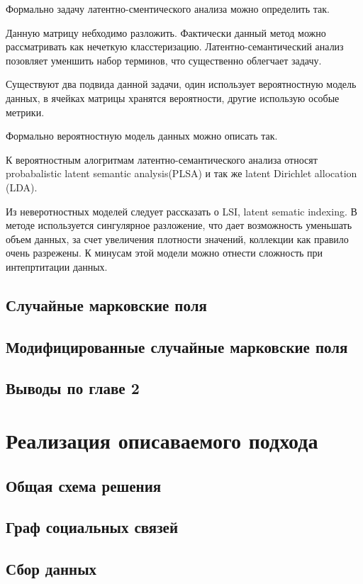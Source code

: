 \documentclass[annotation,times,page4]{itmo-student-thesis}
\begin{document}
Формально задачу латентно-сментического анализа можно определить так.

Данную матрицу небходимо разложить. Фактически данный метод можно рассматривать как нечеткую класстеризацию. Латентно-семантический анализ позовляет уменшить набор терминов, что существенно облегчает задачу.

Существуют два подвида данной задачи, один использует вероятностную модель данных, в ячейках матрицы хранятся вероятности, другие использую особые метрики.

Формально вероятностную модель данных можно описать так.

К вероятностным алогритмам латентно-семантического анализа относят  probabalistic latent semantic analysis(PLSA) и так же latent Dirichlet allocation (LDA).

Из неверотностных моделей следует рассказать о LSI, latent sematic indexing. В методе используется сингулярное разложение, что дает возможность уменьшать объем данных, за счет увеличения плотности значений, коллекции как правило очень разрежены. К минусам этой модели можно отнести сложность при интепртитации данных. 

\section{Случайные марковские поля}
\section{Модифицированные случайные марковские поля}
\section{Выводы по главе 2}

\chapter{Реализация описаваемого подхода}
\section{Общая схема решения}
\section{Граф социальных связей}
\section{Сбор данных}
\end{document}
